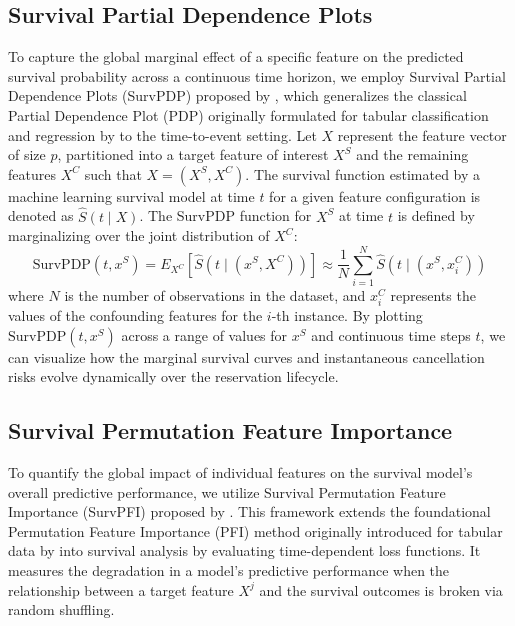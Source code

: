 \documentclass[pdflatex,sn-mathphys-ay]{sn-jnl}%
\theoremstyle{thmstyleone}%
\theoremstyle{thmstyletwo}%
\theoremstyle{thmstylethree}%
\begin{document}
\subsection{Survival Partial Dependence Plots}
To capture the global marginal effect of a specific feature on the predicted survival probability across a continuous time horizon, we employ Survival Partial Dependence Plots (SurvPDP) proposed by \cite{langbein2025interpretable}, which generalizes the classical Partial Dependence Plot (PDP) originally formulated for tabular classification and regression by \cite{friedman2001greedy} to the time-to-event setting. Let $X$ represent the feature vector of size $p$, partitioned into a target feature of interest $X^S$ and the remaining features $X^C$ such that $X = (X^S, X^C)$. The survival function estimated by a machine learning survival model at time $t$ for a given feature configuration is denoted as $\hat{S}(t \mid X)$. The SurvPDP function for $X^S$ at time $t$ is defined by marginalizing over the joint distribution of $X^C$:
\begin{equation}
\text{SurvPDP}(t, x^S) = E_{X^C} \left[ \hat{S}(t \mid (x^S, X^C)) \right] \approx \frac{1}{N} \sum_{i=1}^N \hat{S}\left(t \mid (x^S, x_i^C)\right)
\end{equation}
where $N$ is the number of observations in the dataset, and $x_i^C$ represents the values of the confounding features for the $i$-th instance. By plotting $\text{SurvPDP}(t, x^S)$ across a range of values for $x^S$ and continuous time steps $t$, we can visualize how the marginal survival curves and instantaneous cancellation risks evolve dynamically over the reservation lifecycle.

\subsection{Survival Permutation Feature Importance}
To quantify the global impact of individual features on the survival model's overall predictive performance, we utilize Survival Permutation Feature Importance (SurvPFI) proposed by \cite{langbein2025interpretable}. This framework extends the foundational Permutation Feature Importance (PFI) method originally introduced for tabular data by \cite{breiman2001random} into survival analysis by evaluating time-dependent loss functions. It measures the degradation in a model's predictive performance when the relationship between a target feature $X^j$ and the survival outcomes is broken via random shuffling. 
\end{document}
